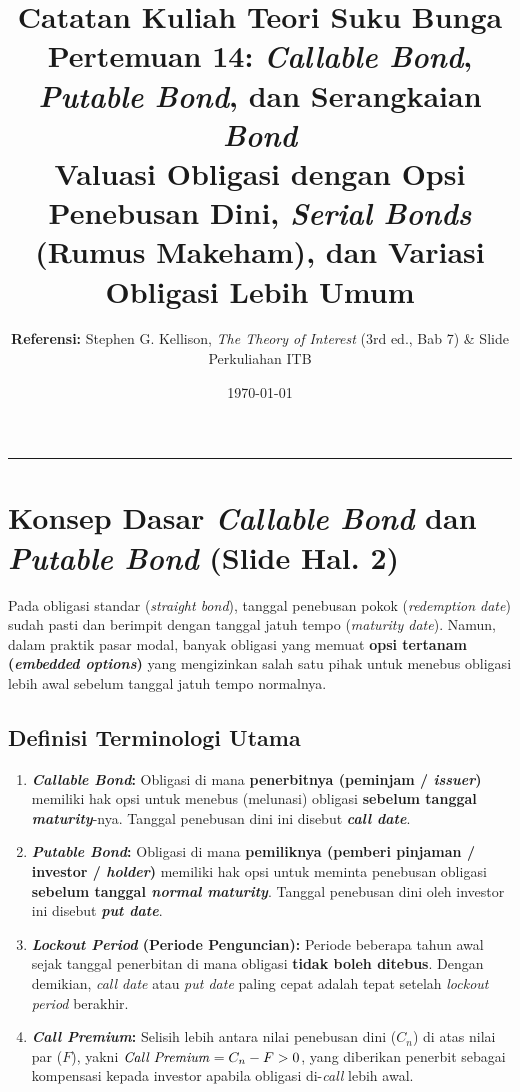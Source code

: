 \documentclass[11pt,a4paper]{article}
\title{\textbf{\LARGE Catatan Kuliah Teori Suku Bunga}\\[0.3em]
\Large Pertemuan 14: \textit{Callable Bond}, \textit{Putable Bond}, dan Serangkaian \textit{Bond}\\[0.2em]
\large Valuasi Obligasi dengan Opsi Penebusan Dini, \textit{Serial Bonds} (Rumus Makeham), dan Variasi Obligasi Lebih Umum}
\author{\textbf{Referensi:} Stephen G. Kellison, \textit{The Theory of Interest} (3rd ed., Bab 7) \& Slide Perkuliahan ITB}
\date{\today}
\begin{document}
\maketitle
\tableofcontents
\vspace{1em}
\noindent\rule{\textwidth}{0.4pt}
\vspace{1.5em}

\section{Konsep Dasar \textit{Callable Bond} dan \textit{Putable Bond} (Slide Hal. 2)}

Pada obligasi standar (\textit{straight bond}), tanggal penebusan pokok (\textit{redemption date}) sudah pasti dan berimpit dengan tanggal jatuh tempo (\textit{maturity date}). Namun, dalam praktik pasar modal, banyak obligasi yang memuat \textbf{opsi tertanam (\textit{embedded options})} yang mengizinkan salah satu pihak untuk menebus obligasi lebih awal sebelum tanggal jatuh tempo normalnya.

\subsection{Definisi Terminologi Utama}

\begin{definitionbox}
\begin{enumerate}[label=\textbf{\arabic*.}]
    \item \textbf{\textit{Callable Bond}:} Obligasi di mana \textbf{penerbitnya (peminjam / \textit{issuer})} memiliki hak opsi untuk menebus (melunasi) obligasi \textbf{sebelum tanggal \textit{maturity}}-nya. Tanggal penebusan dini ini disebut \textbf{\textit{call date}}.
    \item \textbf{\textit{Putable Bond}:} Obligasi di mana \textbf{pemiliknya (pemberi pinjaman / investor / \textit{holder})} memiliki hak opsi untuk meminta penebusan obligasi \textbf{sebelum tanggal \textit{normal maturity}}. Tanggal penebusan dini oleh investor ini disebut \textbf{\textit{put date}}.
    \item \textbf{\textit{Lockout Period} (Periode Penguncian):} Periode beberapa tahun awal sejak tanggal penerbitan di mana obligasi \textbf{tidak boleh ditebus}. Dengan demikian, \textit{call date} atau \textit{put date} paling cepat adalah tepat setelah \textit{lockout period} berakhir.
    \item \textbf{\textit{Call Premium}:} Selisih lebih antara nilai penebusan dini ($C_n$) di atas nilai par ($F$), yakni $\text{\textit{Call Premium}} = C_n - F > 0$, yang diberikan penerbit sebagai kompensasi kepada investor apabila obligasi di-\textit{call} lebih awal.
\end{enumerate}
\end{definitionbox}
\end{document}
